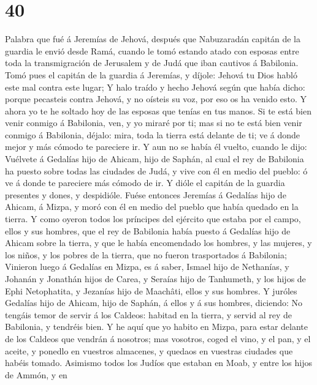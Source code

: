 \hypertarget{section-39}{%
\section{40}\label{section-39}}

 Palabra que fué á Jeremías de Jehová, después que
Nabuzaradán capitán de la guardia le envió desde Ramá, cuando le tomó
estando atado con esposas entre toda la transmigración de Jerusalem y de
Judá que iban cautivos á Babilonia.  Tomó pues el capitán
de la guardia á Jeremías, y díjole: Jehová tu Dios habló este mal contra
este lugar;  Y halo traído y hecho Jehová según que había
dicho: porque pecasteis contra Jehová, y no oísteis su voz, por eso os
ha venido esto.  Y ahora yo te he soltado hoy de las
esposas que tenías en tus manos. Si te está bien venir conmigo á
Babilonia, ven, y yo miraré por ti; mas si no te está bien venir conmigo
á Babilonia, déjalo: mira, toda la tierra está delante de ti; ve á donde
mejor y más cómodo te pareciere ir.  Y aun no se había él
vuelto, cuando le dijo: Vuélvete á Gedalías hijo de Ahicam, hijo de
Saphán, al cual el rey de Babilonia ha puesto sobre todas las ciudades
de Judá, y vive con él en medio del pueblo: ó ve á donde te pareciere
más cómodo de ir. Y dióle el capitán de la guardia presentes y dones, y
despidióle.  Fuése entonces Jeremías á Gedalías hijo de
Ahicam, á Mizpa, y moró con él en medio del pueblo que había quedado en
la tierra.  Y como oyeron todos los príncipes del ejército
que estaba por el campo, ellos y sus hombres, que el rey de Babilonia
había puesto á Gedalías hijo de Ahicam sobre la tierra, y que le había
encomendado los hombres, y las mujeres, y los niños, y los pobres de la
tierra, que no fueron trasportados á Babilonia;  Vinieron
luego á Gedalías en Mizpa, es á saber, Ismael hijo de Nethanías, y
Johanán y Jonathán hijos de Carea, y Seraías hijo de Tanhumeth, y los
hijos de Ephi Netophatita, y Jezanías hijo de Maachâti, ellos y sus
hombres.  Y juróles Gedalías hijo de Ahicam, hijo de
Saphán, á ellos y á sus hombres, diciendo: No tengáis temor de servir á
los Caldeos: habitad en la tierra, y servid al rey de Babilonia, y
tendréis bien.  Y he aquí que yo habito en Mizpa, para
estar delante de los Caldeos que vendrán á nosotros; mas vosotros, coged
el vino, y el pan, y el aceite, y ponedlo en vuestros almacenes, y
quedaos en vuestras ciudades que habéis tomado.  Asimismo
todos los Judíos que estaban en Moab, y entre los hijos de Ammón, y en
